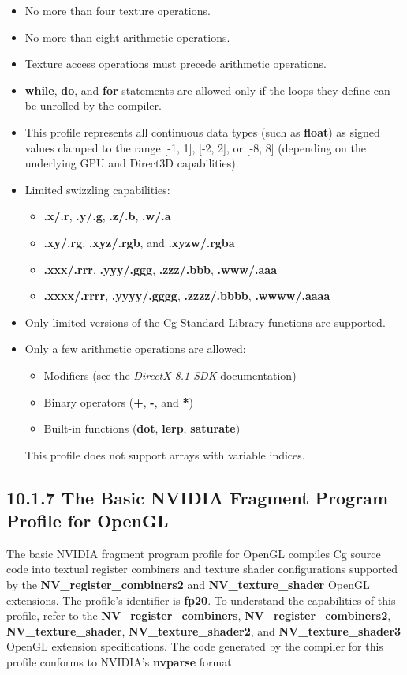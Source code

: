 \documentclass[../main.tex]{subfiles}
\begin{document}
\begin{itemize}
\item No more than four texture operations.
\item No more than eight arithmetic operations.
\item Texture access operations must precede arithmetic operations.
\item \textbf{while}, \textbf{do}, and \textbf{for} statements are allowed only if the loops they define can be unrolled by the compiler.
\item This profile represents all continuous data types (such as \textbf{float}) as signed values clamped to the range [-1, 1], [-2, 2], or [-8, 8] (depending on the underlying GPU and Direct3D capabilities).
\item Limited swizzling capabilities:
\begin{itemize}
    \item \textbf{.x/.r}, \textbf{.y/.g}, \textbf{.z/.b}, \textbf{.w/.a}
    \item \textbf{.xy/.rg}, \textbf{.xyz/.rgb}, and \textbf{.xyzw/.rgba}
    \item \textbf{.xxx/.rrr}, \textbf{.yyy/.ggg}, \textbf{.zzz/.bbb}, \textbf{.www/.aaa}
    \item \textbf{.xxxx/.rrrr}, \textbf{.yyyy/.gggg}, \textbf{.zzzz/.bbbb}, \textbf{.wwww/.aaaa}
\end{itemize}
\item Only limited versions of the Cg Standard Library functions are supported.
\item Only a few arithmetic operations are allowed:
\begin{itemize}
    \item Modifiers (see the \textit{DirectX 8.1 SDK} documentation)
    \item Binary operators (\textbf{+}, \textbf{-}, and \textbf{*})
    \item Built-in functions (\textbf{dot}, \textbf{lerp}, \textbf{saturate})
\end{itemize}
This profile does not support arrays with variable indices.
\end{itemize}

\subsection{10.1.7 The Basic NVIDIA Fragment Program Profile for OpenGL}

The basic NVIDIA fragment program profile for OpenGL compiles Cg source code into textual register combiners and texture shader configurations supported by the \textbf{NV_register_combiners2} and \textbf{NV_texture_shader} OpenGL extensions. The profile's identifier is \textbf{fp20}. To understand the capabilities of this profile, refer to the \textbf{NV_register_combiners}, \textbf{NV_register_combiners2}, \textbf{NV_texture_shader}, \textbf{NV_texture_shader2}, and \textbf{NV_texture_shader3} OpenGL extension specifications. The code generated by the compiler for this profile conforms to NVIDIA's \textbf{nvparse} format.
\end{document}
